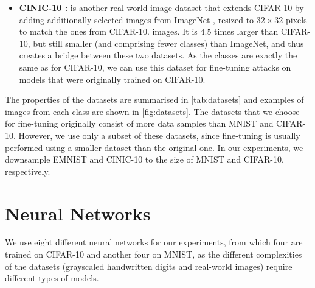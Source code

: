 \begin{itemize}
    \item \textbf{CINIC-10 \cite{darlow_cinic-10_2018}:} is another real-world image dataset that extends CIFAR-10 by adding additionally selected images from ImageNet \cite{russakovsky_imagenet_2015}, resized to $32\times32$ pixels to match the ones from CIFAR-10. images. It is $4.5$ times larger than CIFAR-10, but still smaller (and comprising fewer classes) than ImageNet, and thus creates a bridge between these two datasets. As the classes are exactly the same as for CIFAR-10, we can use this dataset for fine-tuning attacks on models that were originally trained on CIFAR-10.
\end{itemize}

The properties of the datasets are summarised in \cref{tab:datasets} and examples of images from each class are shown in \cref{fig:datasets}. The datasets that we choose for fine-tuning originally consist of more data samples than MNIST and CIFAR-10. However, we use only a subset of these datasets, since fine-tuning is usually performed using a smaller dataset than the original one. In our experiments, we downsample EMNIST and CINIC-10 to the size of MNIST and CIFAR-10, respectively.




\section{Neural Networks}
We use eight different neural networks for our experiments, from which four are trained on CIFAR-10 and another four on MNIST, as the different complexities of the datasets (grayscaled handwritten digits and real-world images) require different types of models. 

